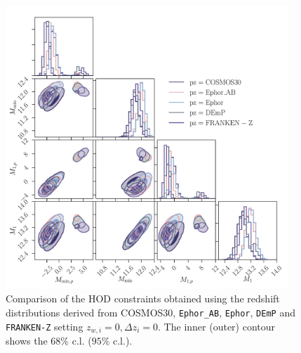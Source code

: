 \documentclass[a4paper,11pt]{article}
\begin{document}
\begin{figure}
\begin{center}
\includegraphics[width=0.95\textwidth]{figures/contours-Mmin-M1_mPk=HOD_fix=alpha-fc-sigmaM_HOD=zevol_no-pz-shifts_fit=auto+cross_cosmo=const_HOD-param=zfid_clfit=HOD-zevol_pz-methods.pdf}
\caption{Comparison of the HOD constraints obtained using the redshift distributions derived from COSMOS30, \texttt{Ephor\_AB}, \texttt{Ephor}, \texttt{DEmP} and \texttt{FRANKEN-Z} setting $z_{w, i} = 0, \Delta z_{i} = 0$. The inner (outer) contour shows the $68 \%$ c.l. ($95 \%$ c.l.).}
\label{fig:constraints-HOD-no-pz-shifts-pz-methods}
\end{center}
\end{figure}


\end{document}
